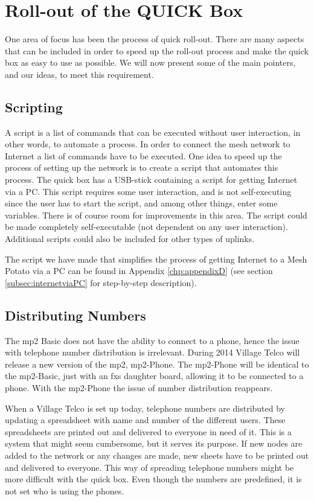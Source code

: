 \chapter{Roll-out of the QUICK Box}
\label{chp:manuals} 

One area of focus has been the process of quick roll-out. There are many aspects that can be included in order to speed up the roll-out process and make the \gls{quick} box as easy to use as possible. We will now present some of the main pointers, and our ideas, to meet this requirement.


\section{Scripting}
A script is a list of commands that can be executed without user interaction, in other words, to automate a process. In order to connect the mesh network to Internet a list of commands have to be executed. One idea to speed up the process of setting up the network is to create a script that automates this process. The \gls{quick} box has a USB-stick containing a script for getting Internet via a PC. This script requires some user interaction, and is not self-executing since the user has to start the script, and among other things, enter some variables. There is of course room for improvements in this area. The script could be made completely self-executable (not dependent on any user interaction). Additional scripts could also be included for other types of uplinks. 

The script we have made that simplifies the process of getting Internet to a Mesh Potato via a PC can be found in Appendix \ref{chp:appendixD} (see section \ref{subsec:internetviaPC} for step-by-step description). 

\section{Distributing Numbers}
The \gls{mp2} Basic does not have the ability to connect to a phone, hence the issue with telephone number distribution is irrelevant. During 2014 Village Telco will release a new version of the \gls{mp2}, \gls{mp2}-Phone. The \gls{mp2}-Phone will be identical to the \gls{mp2}-Basic, just with an \gls{fxs} daughter board, allowing it to be connected to a phone. With the \gls{mp2}-Phone the issue of number distribution reappears. 

When a Village Telco is set up today, telephone numbers are distributed by updating a spreadsheet with name and number of the different users. These spreadsheets are printed out and delivered to everyone in need of it. This is a system that might seem cumbersome, but it serves its purpose. If new nodes are added to the network or any changes are made, new sheets have to be printed out and delivered to everyone. This way of spreading telephone numbers might be more difficult with the \gls{quick} box. Even though the numbers are predefined, it is not set who is using the phones.  

